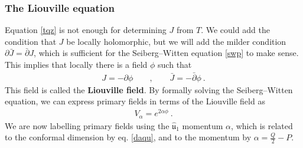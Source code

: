 \documentclass[12pt, a4paper, notitlepage, twoside]{report}
\numberwithin{equation}{section}
\theoremstyle{break}
\begin{document}
\subsubsection{The Liouville equation}

Equation \eqref{tqz} is not enough for determining $J$ from $T$. We could add the condition that $J$ be locally holomorphic, but we will add the milder condition $\partial \bar J = \bar\partial J$, 
which is sufficient for the Seiberg--Witten equation \eqref{swp} to make sense. This implies that locally there is a field $\phi$ such that 
\begin{align}
 J = -\partial \phi \qquad , \qquad \bar J = -\bar\partial \phi \ .
\end{align}
This field is called the \textbf{Liouville field}. By formally solving the Seiberg--Witten equation, we can express primary fields in terms of the Liouville field as 
\begin{align}
 V_\alpha = e^{2\alpha \phi} \ .
\end{align}
We are now labelling primary fields using the $\hat{\mathfrak{u}}_1$ momentum $\alpha$, which is related to the conformal dimension by eq. \eqref{daqu}, and to the momentum by $\alpha =\frac{Q}{2}-P$.
\end{document}
